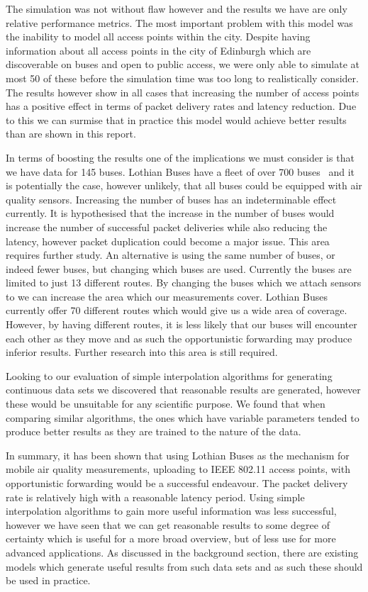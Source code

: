 The simulation was not without flaw however and the results we have are only relative performance metrics. The most important problem with this model was the inability to model all access points within the city. Despite having information about all access points in the city of Edinburgh which are discoverable on buses and open to public access, we were only able to simulate at most 50 of these before the simulation time was too long to realistically consider. The results however show in all cases that increasing the number of access points has a positive effect in terms of packet delivery rates and latency reduction. Due to this we can surmise that in practice this model would achieve better results than are shown in this report. 

In terms of boosting the results one of the implications we must consider is that we have data for 145 buses. Lothian Buses have a fleet of over 700 buses~\cite{lothianbusannualreport} and it is potentially the case, however unlikely, that all buses could be equipped with air quality sensors. Increasing the number of buses has an indeterminable effect currently. It is hypothesised that the increase in the number of buses would increase the number of successful packet deliveries while also reducing the latency, however packet duplication could become a major issue. This area requires further study. An alternative is using the same number of buses, or indeed fewer buses, but changing which buses are used. Currently the buses are limited to just 13 different routes. By changing the buses which we attach sensors to we can increase the area which our measurements cover. Lothian Buses currently offer 70 different routes which would give us a wide area of coverage. However, by having different routes, it is less likely that our buses will encounter each other as they move and as such the opportunistic forwarding may produce inferior results. Further research into this area is still required.

Looking to our evaluation of simple interpolation algorithms for generating continuous data sets we discovered that reasonable results are generated, however these would be unsuitable for any scientific purpose. We found that when comparing similar algorithms, the ones which have variable parameters tended to produce better results as they are trained to the nature of the data. 


In summary, it has been shown that using Lothian Buses as the mechanism for mobile air quality measurements, uploading to IEEE 802.11 access points, with opportunistic forwarding would be a successful endeavour. The packet delivery rate is relatively high with a reasonable latency period. Using simple interpolation algorithms to gain more useful information was less successful, however we have seen that we can get reasonable results to some degree of certainty which is useful for a more broad overview, but of less use for more advanced applications. As discussed in the background section, there are existing models which generate useful results from such data sets and as such these should be used in practice. 

